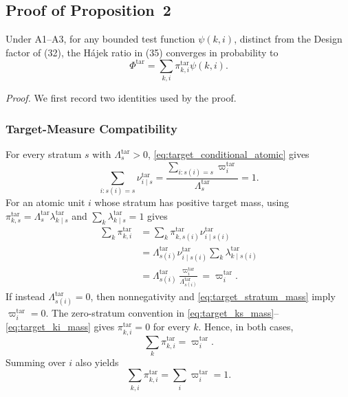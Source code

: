 \subsection{Proof of Proposition~2}
\label{app:proof_prop2}

\begin{proposition*}
Under A1--A3, for any bounded test function $\psi(k,i)$, distinct from
the Design factor of (32), the H\'ajek ratio in
(35) converges in probability to
\begin{equation}
    \Phi^{\mathrm{tar}}
    =
    \sum_{k,i}
    \pi^{\mathrm{tar}}_{k,i}\psi(k,i).
    \label{eq:app_target_phi}
\end{equation}
\end{proposition*}

\noindent\emph{Proof.}
We first record two identities used by the proof.

\subsubsection{Target-Measure Compatibility}

For every stratum $s$ with $\Lambda_s^{\mathrm{tar}}>0$,
\eqref{eq:target_conditional_atomic} gives
\begin{equation}
    \sum_{i:s(i)=s}
    \nu^{\mathrm{tar}}_{i\mid s}
    =
    \frac{
    \sum_{i:s(i)=s}\varpi_i^{\mathrm{tar}}
    }{
    \Lambda_s^{\mathrm{tar}}
    }
    =1.
    \label{eq:app_nu_normalization}
\end{equation}
For an atomic unit $i$ whose stratum has positive target mass, using
$\pi^{\mathrm{tar}}_{k,s}
=\Lambda_s^{\mathrm{tar}}
\lambda^{\mathrm{tar}}_{k\mid s}$ and
$\sum_k\lambda^{\mathrm{tar}}_{k\mid s}=1$ gives
\begin{align}
 \sum_k\pi^{\mathrm{tar}}_{k,i}
 &=
 \sum_k
 \pi^{\mathrm{tar}}_{k,s(i)}
 \nu^{\mathrm{tar}}_{i\mid s(i)}
 \nonumber\\
 &=
 \Lambda_{s(i)}^{\mathrm{tar}}
 \nu^{\mathrm{tar}}_{i\mid s(i)}
 \sum_k
 \lambda^{\mathrm{tar}}_{k\mid s(i)}
 \nonumber\\
 &=
 \Lambda_{s(i)}^{\mathrm{tar}}
 \frac{\varpi_i^{\mathrm{tar}}}
 {\Lambda_{s(i)}^{\mathrm{tar}}}
 =
 \varpi_i^{\mathrm{tar}}.
 \label{eq:app_target_compatibility_positive}
\end{align}
If instead $\Lambda_{s(i)}^{\mathrm{tar}}=0$, then nonnegativity and
\eqref{eq:target_stratum_mass} imply $\varpi_i^{\mathrm{tar}}=0$.  The
zero-stratum convention in
\eqref{eq:target_ks_mass}--\eqref{eq:target_ki_mass}
gives $\pi^{\mathrm{tar}}_{k,i}=0$ for every $k$.  Hence, in both cases,
\begin{equation}
 \sum_k\pi^{\mathrm{tar}}_{k,i}
 =\varpi_i^{\mathrm{tar}}.
 \label{eq:app_target_compatibility}
\end{equation}
Summing over $i$ also yields
\begin{equation}
    \sum_{k,i}\pi^{\mathrm{tar}}_{k,i}
    =
    \sum_i\varpi_i^{\mathrm{tar}}
    =1.
    \label{eq:app_pi_normalized}
\end{equation}


